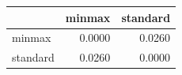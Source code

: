 \begin{tabular}{lrr}
\toprule
 & minmax & standard \\
\midrule
minmax & 0.0000 & 0.0260 \\
standard & 0.0260 & 0.0000 \\
\bottomrule
\end{tabular}
